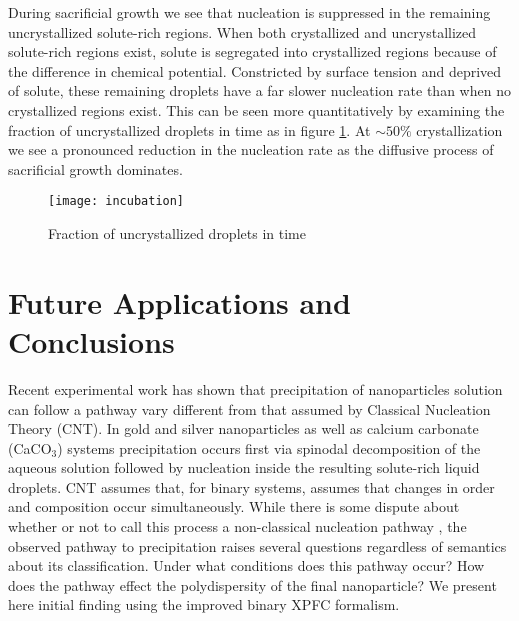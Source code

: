 
During sacrificial growth we see that nucleation is suppressed in the remaining
uncrystallized solute-rich regions. When both crystallized and uncrystallized
solute-rich regions exist, solute is segregated into crystallized regions
because of the difference in chemical potential. Constricted by surface tension
and deprived of solute, these remaining droplets have a far slower nucleation
rate than when no crystallized regions exist. This can be seen more
quantitatively by examining the fraction of uncrystallized droplets in time as
in figure \ref{fig:incubation}. At $\sim 50\%$ crystallization we see a
pronounced reduction in the nucleation rate as the diffusive process of
sacrificial growth dominates.

\begin{figure}
    \centering
    \texttt{[image: incubation]}
    \caption[Fraction of uncrystallized droplets in time]{
        \label{fig:incubation}
        Fraction of uncrystallized droplets in time
    }
\end{figure}

\section{Future Applications and Conclusions} %




Recent experimental work has shown that precipitation of nanoparticles solution
can follow a pathway vary different from that assumed by Classical Nucleation
Theory (CNT).  In gold and silver nanoparticles\cite{LOH17} as well as calcium
carbonate (CaCO${}_3$)\cite{WALLACE13} systems precipitation occurs first via
spinodal decomposition of the aqueous solution followed by nucleation inside
the resulting solute-rich liquid droplets. CNT assumes that, for binary
systems, assumes that changes in order and composition occur simultaneously.
While there is some dispute about whether or not to call this process a
non-classical nucleation pathway \cite{DAVEY13, GEBAUER11}, the observed pathway
to precipitation raises several questions regardless of semantics about its
classification. Under what conditions does this pathway occur? How does the 
pathway effect the polydispersity of the final nanoparticle? We present here
initial finding using the improved binary XPFC formalism.

